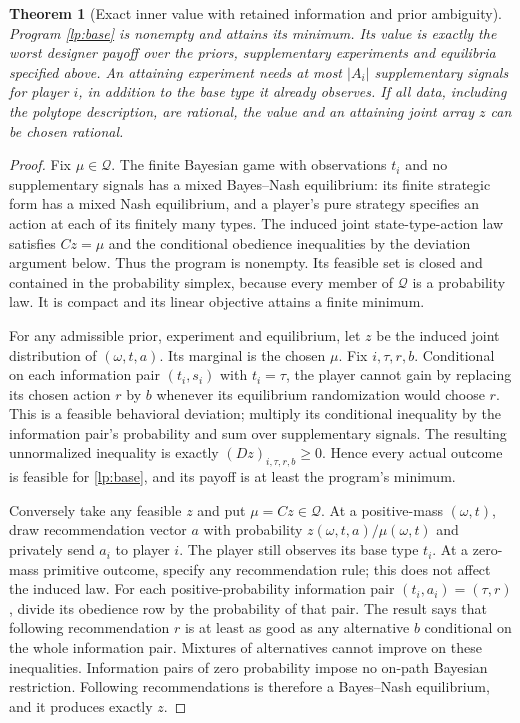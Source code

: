 \documentclass[11pt]{article}
\newtheorem{theorem}{Theorem}
\theoremstyle{definition}
\theoremstyle{remark}
\begin{document}
\begin{theorem}[Exact inner value with retained information and prior ambiguity]
Program \eqref{lp:base} is nonempty and attains its minimum. Its value
is exactly the worst designer payoff over the priors, supplementary
experiments and equilibria specified above. An attaining experiment
needs at most $|A_i|$ supplementary signals for player $i$, in addition
to the base type it already observes. If all data, including the
polytope description, are rational, the value and an attaining joint
array $z$ can be chosen rational.
\end{theorem}
\begin{proof}
Fix $\mu\in\mathcal Q$. The finite Bayesian game with observations
$t_i$ and no supplementary signals has a mixed Bayes--Nash equilibrium:
its finite strategic form has a mixed Nash equilibrium, and a player's
pure strategy specifies an action at each of its finitely many types.
The induced joint state-type-action law satisfies $Cz=\mu$ and the
conditional obedience inequalities by the deviation argument below.
Thus the program is nonempty. Its feasible set is closed and contained
in the probability simplex, because every member of $\mathcal Q$ is a
probability law. It is compact and its linear objective attains a
finite minimum.

For any admissible prior, experiment and equilibrium, let $z$ be the
induced joint distribution of $(\omega,t,a)$. Its marginal is the
chosen $\mu$. Fix $i,\tau,r,b$. Conditional on each information pair
$(t_i,s_i)$ with $t_i=\tau$, the player cannot gain by replacing its
chosen action $r$ by $b$ whenever its equilibrium randomization would
choose $r$. This is a feasible behavioral deviation; multiply its
conditional inequality by the information pair's probability and sum
over supplementary signals. The resulting unnormalized inequality is
exactly $(Dz)_{i,\tau,r,b}\geq0$. Hence every actual outcome is feasible
for \eqref{lp:base}, and its payoff is at least the program's minimum.

Conversely take any feasible $z$ and put $\mu=Cz\in\mathcal Q$.
At a positive-mass $(\omega,t)$, draw recommendation vector $a$ with
probability $z(\omega,t,a)/\mu(\omega,t)$ and privately send $a_i$ to
player $i$. The player still observes its base type $t_i$. At a
zero-mass primitive outcome, specify any recommendation rule; this
does not affect the induced law. For each positive-probability
information pair $(t_i,a_i)=(\tau,r)$, divide its obedience row by the
probability of that pair. The result says that following recommendation
$r$ is at least as good as any alternative $b$ conditional on the
whole information pair. Mixtures of alternatives cannot improve on
these inequalities. Information pairs of zero probability impose no
on-path Bayesian restriction. Following recommendations is therefore
a Bayes--Nash equilibrium, and it produces exactly $z$.


\end{proof}
\end{document}
